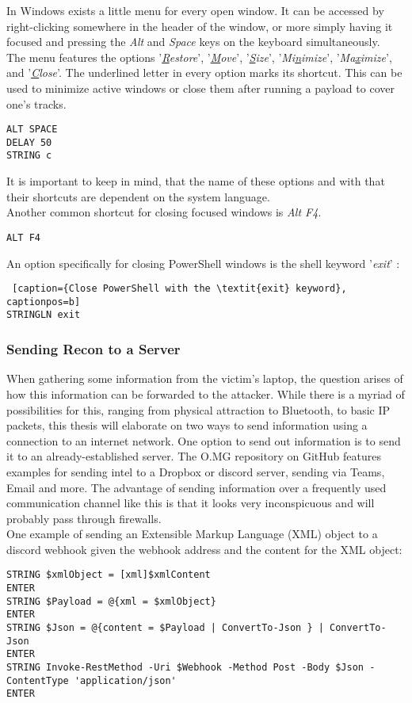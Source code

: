 In Windows exists a little menu for every open window. It can be accessed by right-clicking somewhere in the header of the window, or more simply having it focused and pressing the \textit{Alt} and \textit{Space} keys on the keyboard simultaneously. \\
The menu features the options '\textit{\underline{R}estore}', '\textit{\underline{M}ove}', '\textit{\underline{S}ize}', '\textit{Mi\underline{n}imize}', '\textit{Ma\underline{x}imize}', and '\textit{\underline{C}lose}'. The underlined letter in every option marks its shortcut. This can be used to minimize active windows or close them after running a payload to cover one's tracks.
\begin{lstlisting}[caption={Close a window through its window menu}, captionpos=b]
ALT SPACE
DELAY 50
STRING c
\end{lstlisting}
It is important to keep in mind, that the name of these options and with that their shortcuts are dependent on the system language. \\
Another common shortcut for closing focused windows is \textit{Alt F4}.
\begin{lstlisting}[caption={Close a window with ALT F4}, captionpos=b]
ALT F4
\end{lstlisting}


An option specifically for closing PowerShell windows is the shell keyword '\textit{exit}' :
\begin{lstlisting} [caption={Close PowerShell with the \textit{exit} keyword}, captionpos=b]
STRINGLN exit
\end{lstlisting}


\subsubsection{Sending Recon to a Server}

When gathering some information from the victim's laptop, the question arises of how this information can be forwarded to the attacker. While there is a myriad of possibilities for this, ranging from physical attraction to Bluetooth, to basic IP packets, this thesis will elaborate on two ways to send information using a connection to an internet network.
One option to send out information is to send it to an already-established server. The O.MG repository on GitHub features examples for sending intel to a Dropbox or discord server, sending via Teams, Email and more. The advantage of sending information over a frequently used communication channel like this is that it looks very inconspicuous and will probably pass through firewalls.\\
One example of sending an Extensible Markup Language (XML) object to a discord webhook given the webhook address and the content for the XML object:
\begin{lstlisting}[caption={Send an XML object through PowerShell}, captionpos=b]
STRING $xmlObject = [xml]$xmlContent
ENTER
STRING $Payload = @{xml = $xmlObject}
ENTER
STRING $Json = @{content = $Payload | ConvertTo-Json } | ConvertTo-Json	
ENTER
STRING Invoke-RestMethod -Uri $Webhook -Method Post -Body $Json -ContentType 'application/json'
ENTER
\end{lstlisting}

